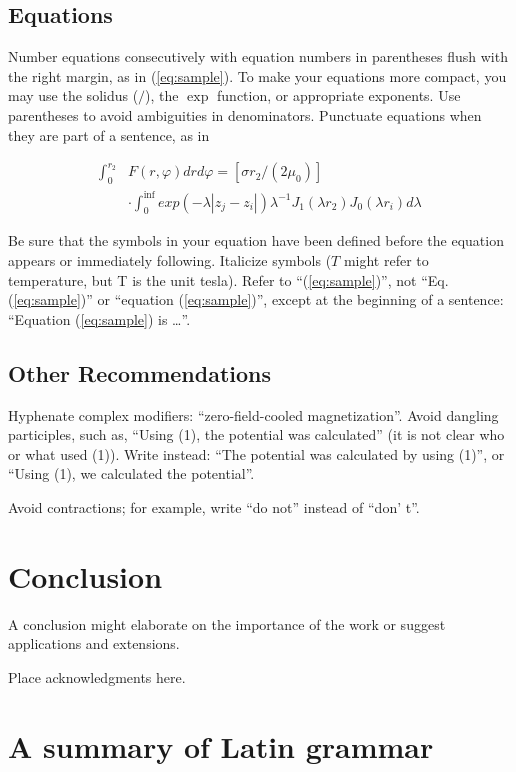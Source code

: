 \documentclass{ifacconf}
\begin{document}
\subsection{Equations}

Number equations consecutively with equation numbers in parentheses
flush with the right margin, as in (\ref{eq:sample}).  To make your equations more
compact, you may use the solidus ($/$), the $\exp$ function, or
appropriate exponents. Use parentheses to avoid ambiguities in
denominators. Punctuate equations when they are part of a sentence, as
in

\begin{equation} \label{eq:sample2}
\begin{array}{ll}
\int_0^{r_2} & F (r, \varphi ) dr d\varphi = [\sigma r_2 / (2 \mu_0 )] \\
& \cdot \int_0^{\inf} exp(-\lambda |z_j - z_i |) \lambda^{-1} J_1 (\lambda  r_2 ) J_0 (\lambda r_i ) d\lambda 
\end{array}
\end{equation}

Be sure that the symbols in your equation have been defined before the
equation appears or immediately following. Italicize symbols ($T$
might refer to temperature, but T is the unit tesla). Refer to
``(\ref{eq:sample})'', not ``Eq. (\ref{eq:sample})'' or ``equation
(\ref{eq:sample})'', except at the beginning of a sentence: ``Equation
(\ref{eq:sample}) is \ldots''.

\subsection{Other Recommendations}

Hyphenate complex modifiers:
``zero-field-cooled magnetization''. Avoid dangling participles, such
as, ``Using (1), the potential was calculated'' (it is not clear who or
what used (1)). Write instead: ``The potential was calculated by using
(1)'', or ``Using (1), we calculated the potential''.

Avoid contractions;
for example, write ``do not'' instead of ``don' t''. 


\section{Conclusion}

A conclusion might elaborate on the importance of the work
or suggest applications and extensions.

\begin{ack}
Place acknowledgments here.
\end{ack}



\appendix
\section{A summary of Latin grammar}    %
\end{document}

